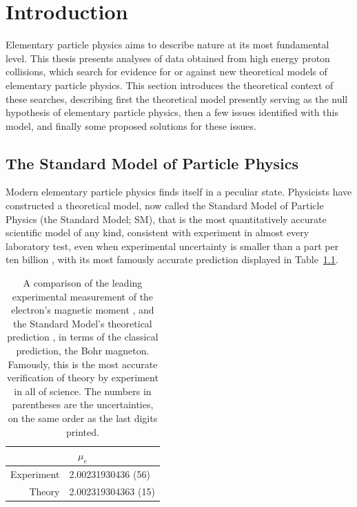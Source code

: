 \chapter{Introduction}

Elementary particle physics aims to describe nature at its most fundamental level.
This thesis presents analyses of data obtained from high energy proton collisions, which search for evidence for or against new theoretical models of elementary particle physics.
This section introduces the theoretical context of these searches, describing first the theoretical model presently serving as the null hypothesis of elementary particle physics, then a few issues identified with this model, and finally some proposed solutions for these issues.

\section{The Standard Model of Particle Physics} \label{sec:standardmodel}

Modern elementary particle physics finds itself in a peculiar state.
Physicists have constructed a theoretical model, now called the Standard Model of Particle Physics (the Standard Model; SM), that is the most quantitatively accurate scientific model of any kind, consistent with experiment in almost every laboratory test, even when experimental uncertainty is smaller than a part per ten billion \cite{electronmu_exp,electronmu_th}, with its most famously accurate prediction displayed in Table~\ref{tab:electronmu}.
\begin{table}
\centering
\begin{tabular}{r l}
\multicolumn{2}{c}{$\mu_e$} \\
\hline
Experiment & 2.00231930436 (56) \\
Theory & 2.002319304363 (15)
\end{tabular}
\caption[Comparison of theoretical prediction and experimental measurement of the electron magnetic moment.]
        {A comparison of the leading experimental measurement of the electron's magnetic moment \cite{electronmu_exp}, and the Standard Model's theoretical prediction \cite{electronmu_th}, in terms of the classical prediction, the Bohr magneton. 
          Famously, this is the most accurate verification of theory by experiment in all of science. 
          The numbers in parentheses are the uncertainties, on the same order as the last digits printed.}
\label{tab:electronmu}
\end{table}

